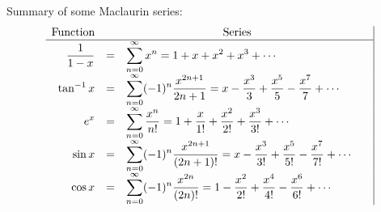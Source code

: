 \begin{frame}
Summary of some Maclaurin series:
\[
\begin{array}{rcl@{\qquad}|r}
\textrm{Function} & \multicolumn{2}{c|}{\textrm{Series}}  \\
\hline
\displaystyle \frac{1}{1-x} & = & \displaystyle \sum_{n=0}^\infty x^n = 1 + x + x^2 + x^3 + \cdots  \\
\displaystyle \tan^{-1} x & = & \displaystyle \sum_{n=0}^\infty (-1)^n \frac{x^{2n+1}}{2n+1} = x - \frac{x^3}{3} + \frac{x^5}{5} - \frac{x^7}{7} + \cdots  \\
\displaystyle e^x & = & \displaystyle \sum_{n=0}^\infty \frac{x^n}{n!} = 1 + \frac{x}{1!} + \frac{x^2}{2!} + \frac{x^3}{3!} + \cdots   \\
\displaystyle \sin x & = & \displaystyle \sum_{n=0}^\infty (-1)^n \frac{x^{2n+1}}{(2n+1)!} = x - \frac{x^3}{3!} + \frac{x^5}{5!} - \frac{x^7}{7!} + \cdots   \\
\displaystyle \cos x & = & \displaystyle \sum_{n=0}^\infty (-1)^n \frac{x^{2n}}{(2n)!} = 1 - \frac{x^2}{2!} + \frac{x^4}{4!} - \frac{x^6}{6!} + \cdots   \\
\end{array}
\]
\end{frame}
